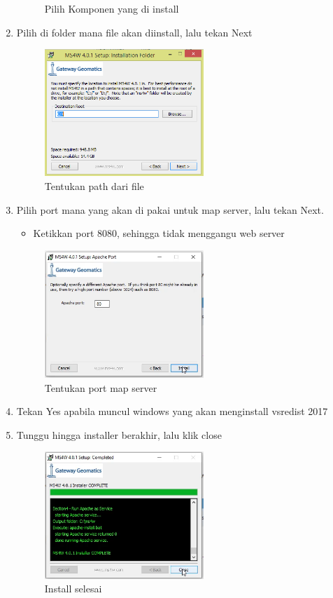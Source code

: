 \begin{enumerate}
\begin{figure}[H]
			\centering
			\caption{Pilih Komponen yang di install}
		\end{figure}
	\item Pilih di folder mana file akan diinstall, lalu tekan Next
		\begin{figure}[H]
			\includegraphics[width=6cm]{figures/Tugas4/1174076/5.png}
			\centering
			\caption{Tentukan path dari file}
		\end{figure}
	\item Pilih port mana yang akan di pakai untuk map server, lalu tekan Next.
	\begin{itemize}
	\item Ketikkan port 8080, sehingga tidak menggangu web server
	\end{itemize}
		\begin{figure}[H]
			\includegraphics[width=6cm]{figures/Tugas4/1174076/6.png}
			\centering
			\caption{Tentukan port map server}
		\end{figure}
	\item Tekan Yes apabila muncul windows yang akan menginstall vsredist 2017
	\item Tunggu hingga installer berakhir, lalu klik close
		\begin{figure}[H]
			\includegraphics[width=6cm]{figures/Tugas4/1174076/7.png}
			\centering
			\caption{Install selesai}
		\end{figure}
\end{enumerate}

